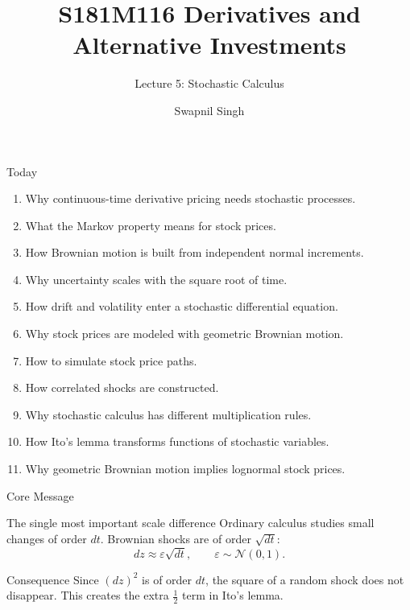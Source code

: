\documentclass[aspectratio=169,11pt]{beamer}
\title{S181M116 Derivatives and Alternative Investments}
\subtitle{Lecture 5: Stochastic Calculus}
\author{Swapnil Singh}
\institute{Lietuvos Bankas and Kaunas University of Technology}
\date{}
\newcommand{\eps}{\varepsilon}
\newcommand{\Normal}{\mathcal{N}}
\newcommand{\Ito}{Ito}
\begin{document}
\begin{frame}
    \titlepage
\end{frame}

\begin{frame}{Today}
    \begin{enumerate}
        \item Why continuous-time derivative pricing needs stochastic processes.
        \item What the Markov property means for stock prices.
        \item How Brownian motion is built from independent normal increments.
        \item Why uncertainty scales with the square root of time.
        \item How drift and volatility enter a stochastic differential equation.
        \item Why stock prices are modeled with geometric Brownian motion.
        \item How to simulate stock price paths.
        \item How correlated shocks are constructed.
        \item Why stochastic calculus has different multiplication rules.
        \item How \Ito's lemma transforms functions of stochastic variables.
        \item Why geometric Brownian motion implies lognormal stock prices.
    \end{enumerate}
\end{frame}

\begin{frame}{Core Message}
    \begin{block}{The single most important scale difference}
        Ordinary calculus studies small changes of order \(dt\).
        Brownian shocks are of order \(\sqrt{dt}\):
        \[
            dz \approx \eps\sqrt{dt},
            \qquad
            \eps\sim\Normal(0,1).
        \]
    \end{block}

    \vspace{0.5em}
    \begin{alertblock}{Consequence}
        Since \((dz)^2\) is of order \(dt\), the square of a random shock does not disappear.
        This creates the extra \(\frac{1}{2}\) term in \Ito's lemma.
    \end{alertblock}
\end{frame}
\end{document}
